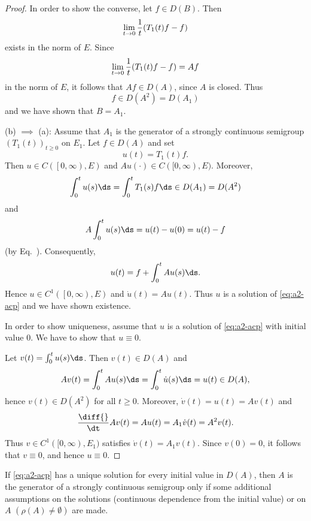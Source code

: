 \begin{proof}
In order to show the converse, let $f \in D(B)$.
Then 
\[ 
\lim_{t \to 0} \frac{1}{t} \mleft( T_{1}(t)f - f \mright)
\]
exists in the norm of\/ $E$.
Since  
\[ 
\lim_{t \to 0} \frac{1}{t} \mleft( T_{1}(t)f - f \mright)
= Af 
\]
in the norm of $E$, it follows that $Af \in D(A)$, since $A$ is closed.
Thus 
\[
f \in D(A^{2}) = D(A_{1})
\]
and we have shown that $B = A_{1}$.

(b)  $\implies$ (a):  
Assume that $A_{1}$ is the generator of a strongly continuous semigroup $(T_{1}(t))_{t \geq 0}$ on $E_{1}$.
Let $f \in D(A)$ and set 
\[
u(t) = T_{1}(t)f.
\]
Then $u \in C(\left[0,\infty\right),E)$ and $Au(\cdot) \in C([0,\infty),E)$.
Moreover, 
\[
\int_{0}^{t} u(s) \ds = \int_{0}^{t} T_{1}(s) f   \ds \in D(A_{1}) = D(A^{2})
\]
and 
\[
A\int_{0}^{t} u(s) \ds = u(t) - u(0) = u(t) - f
\]
(by Eq.~).
Consequently, 
\[
    u(t) = f + \int_{0}^{t} Au(s) \ds .
\]
Hence $u \in C^{1}(\left[0,\infty  \right),E)$ and $\dot{u}(t) = Au(t)$.
Thus $u$ is a solution of \eqref{eq:a2-acp} and we have shown existence.

In order to show uniqueness, assume that $u$ is a solution of \eqref{eq:a2-acp} with initial value $0$.
We have to show that $u \equiv 0$.

Let $v(t) = \int_{0}^{t} u(s)\ds$.
Then $v(t) \in D(A)$ and
\[
    Av(t) = \int_{0}^{t} Au(s)\ds 
          = \int_{0}^{t} \dot{u}(s)\ds 
          = u(t) \in D(A),
\]
hence $v(t) \in D(A^{2})$ for all $t \geq 0$.
Moreover, $\dot{v}(t) = u(t) = Av(t)$ and
\[
    \frac{\diff{}}{\dt}Av(t) = Au(t) = A_{1}\dot{v}(t) = A^{2}v(t).
\]
Thus $v \in C^{1}([0,\infty), E_{1})$ satisfies $\dot{v}(t) = A_{1}v(t)$.
Since $v(0) = 0$, it follows that $v \equiv 0$, and hence $u \equiv 0$.
\end{proof}
If \eqref{eq:a2-acp} has a unique solution for every initial value in $D(A)$, then $A$ is the generator of a strongly continuous semigroup only if some additional assumptions on the solutions (continuous dependence from the initial value) or on $A$ $(\rho(A) \neq \emptyset)$ are made.
